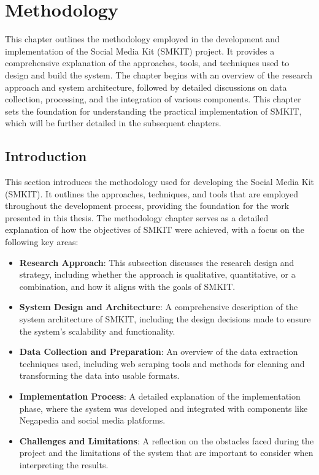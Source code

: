 
\chapter{Methodology}
\label{chp:methodology}
This chapter outlines the methodology employed in the development and implementation of the Social Media Kit (SMKIT) project. It provides a comprehensive explanation of the approaches, tools, and techniques used to design and build the system. The chapter begins with an overview of the research approach and system architecture, followed by detailed discussions on data collection, processing, and the integration of various components.
This chapter sets the foundation for understanding the practical implementation of SMKIT, which will be further detailed in the subsequent chapters.


\section{Introduction}
\label{sec:introduction}
This section introduces the methodology used for developing the Social Media Kit (SMKIT). It outlines the approaches, techniques, and tools that are employed throughout the development process, providing the foundation for the work presented in this thesis. The methodology chapter serves as a detailed explanation of how the objectives of SMKIT were achieved, with a focus on the following key areas:

\begin{itemize}
    \item \textbf{Research Approach}: This subsection discusses the research design and strategy, including whether the approach is qualitative, quantitative, or a combination, and how it aligns with the goals of SMKIT.
    \item \textbf{System Design and Architecture}: A comprehensive description of the system architecture of SMKIT, including the design decisions made to ensure the system’s scalability and functionality.
    \item \textbf{Data Collection and Preparation}: An overview of the data extraction techniques used, including web scraping tools and methods for cleaning and transforming the data into usable formats.
    \item \textbf{Implementation Process}: A detailed explanation of the implementation phase, where the system was developed and integrated with components like Negapedia and social media platforms.
    \item \textbf{Challenges and Limitations}: A reflection on the obstacles faced during the project and the limitations of the system that are important to consider when interpreting the results.
\end{itemize}

